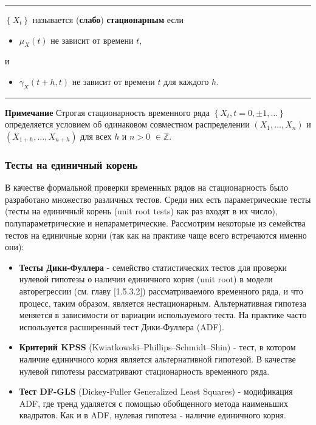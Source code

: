 \noindent\rule{\linewidth}{0.1mm}

\begin{definition}
    $\left\{ X_t \right\}$ называется (\textbf{слабо}) 
    \textbf{стационарным} если
    \begin{itemize}
        \item $\mu_X(t)$ не зависит от времени $t$,
    \end{itemize}
    \vspace{-10pt}
    и 
    \vspace{-10pt}
    \begin{itemize}
        \item $\gamma_X(t+h, t)$ не зависит от времени $t$ для каждого $h$.
    \end{itemize}
    \noindent\rule{\linewidth}{0.1mm}
\end{definition}

\noindent\textbf{Примечание} Строгая стационарность временного ряда $\left\{ 
X_t, t = 0, \pm 1, \dots \right\}$ определяется условием об одинаковом 
совместном распределении
$ \left( X_1, \dots, X_n \right) $ и $ \left( X_{1+h}, \dots, X_{n+h} \right) $ 
для всех $h$ и $n > 0$ $\in \mathbb{Z}$.

\subsubsection{Тесты на единичный корень}

В качестве формальной проверки временных рядов на стационарность было 
разработано множество различных тестов. Среди них есть 
параметрические тесты (тесты на единичный корень (unit root tests) как 
раз входят в их число), полупараметрические и непараметрические. 
Рассмотрим некоторые из семейства тестов на единичные корни (так как 
на практике чаще всего встречаются именно они):

\begin{itemize}
    \item \textbf{Тесты Дики-Фуллера} - семейство статистических тестов для проверки 
    нулевой гипотезы о наличии единичного корня (unit root) в модели 
    авторегрессии (см. главу [1.5.3.2]) рассматриваемого временного ряда, и что процесс, 
    таким образом, является нестационарным. Альтернативная гипотеза меняется в зависимости от 
    вариации используемого теста. На практике часто используется расширенный 
    тест Дики-Фуллера (ADF).

    \item \textbf{Критерий KPSS} (Kwiatkowski–Phillips–Schmidt–Shin) - тест, 
    в котором наличие единичного корня является альтернативной гипотезой. 
    В качестве нулевой гипотезы рассматривают стационарность временного ряда.
    
    \item  \textbf{Тест DF-GLS} (Dickey-Fuller Generalized Least Squares) - 
    модификация ADF, где тренд удаляется с помощью 
    обобщенного метода наименьших квадратов. Как и в ADF, 
    нулевая гипотеза - наличие единичного корня.
\end{itemize}


